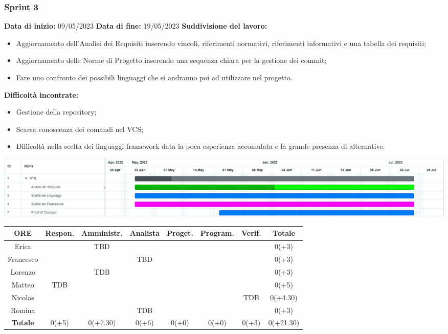 \documentclass[a4paper, 12pt]{article}
\begin{document}
\subsubsection{Sprint 3}
\textbf{Data di inizio:} 09/05/2023\newline
\textbf{Data di fine:} 19/05/2023\newline
\newline
\textbf{Suddivisione del lavoro:}
\begin{itemize}
    \item Aggiornamento dell'Analisi dei Requisiti inserendo vincoli, riferimenti normativi, riferimenti informativi e una tabella dei requisiti;
    \item Aggiornamento delle Norme di Progetto inserendo una sequenza chiara per la gestione dei commit;
    \item Fare uno confronto dei possibili linguaggi che si andranno poi ad utilizzare nel progetto.
\end{itemize}
\textbf{Difficoltà incontrate:}
\begin{itemize}
    \item Gestione della repository;
    \item Scarsa conoscenza dei comandi nel VCS;
    \item Difficoltà nella scelta dei linguaggi framework data la poca esperienza accomulata e la grande presenza di alternative.
\end{itemize}
\includegraphics[scale=0.24]{RTB_2.png}\newline
\newline
\begin{tabular}{|c|c|c|c|c|c|c|c|}
    \hline
    \textbf{ORE} & \textbf{Respon.} & \textbf{Amministr.} & \textbf{Analista} & \textbf{Proget.} & \textbf{Program.} & \textbf{Verif.} & \textbf{Totale}\\
    \hline
    Erica & & TBD & & & & & 0(+3)\\
    \hline
    Francesco & & & TBD & & & & 0(+3)\\
    \hline
    Lorenzo & & TDB & & & & & 0(+3)\\
    \hline
    Matteo & TDB & & & & & & 0(+5)\\
    \hline
    Nicolas & & & & & & TDB & 0(+4.30)\\
    \hline
    Romina & & & TDB & & & & 0(+3)\\
    \hline
    \textbf{Totale} & 0(+5) & 0(+7.30) & 0(+6) & 0(+0) & 0(+0) & 0(+3) & 0(+21.30)\\
    \hline
\end{tabular}\\[8pt]
\end{document}
